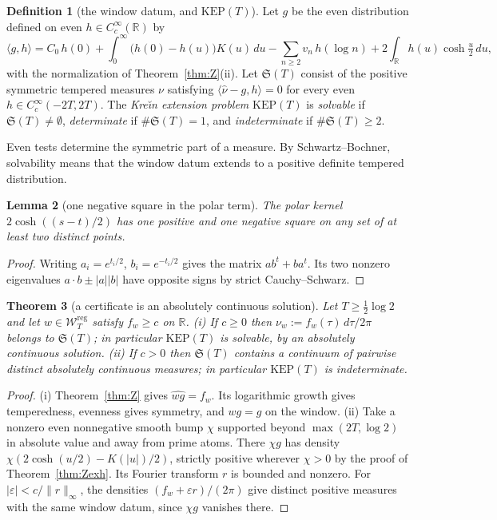 \documentclass[10pt]{amsart}
\newtheorem{theorem}{Theorem}[section]
\newtheorem{lemma}[theorem]{Lemma}
\theoremstyle{definition}
\newtheorem{definition}[theorem]{Definition}
\theoremstyle{remark}
\newcommand{\R}{\mathbb R}
\newcommand{\nuh}{\widehat\nu}
\newcommand{\Wcl}{\mathcal W_T}
\begin{document}
\begin{definition}[the window datum, and $\mathrm{KEP}(T)$]\label{def:KEP}
Let $g$ be the even distribution defined on even $h\in C_c^\infty(\R)$ by
\begin{equation}\label{eq:gdatum}
\langle g,h\rangle=C_0\,h(0)+\int_0^\infty\big(h(0)-h(u)\big)K(u)\,du-\sum_{n\ge2}v_n\,h(\log n)
+2\int_\R h(u)\cosh\tfrac u2\,du,
\end{equation}
with the normalization of Theorem~\ref{thm:Z}(ii). Let $\mathfrak S(T)$ consist of the positive
symmetric tempered measures $\nu$ satisfying $\langle\nuh-g,h\rangle=0$
for every even $h\in C_c^\infty(-2T,2T)$.
The \emph{Kre\u{\i}n extension problem} $\mathrm{KEP}(T)$ is \emph{solvable} if
$\mathfrak S(T)\ne\emptyset$, \emph{determinate} if $\#\mathfrak S(T)=1$, and \emph{indeterminate}
if $\#\mathfrak S(T)\ge2$.
\end{definition}
Even tests determine the symmetric part of a measure. By Schwartz--Bochner,
solvability means that the window datum extends to a positive definite tempered distribution.

\begin{lemma}[one negative square in the polar term]\label{lem:polar}
The polar kernel $2\cosh((s-t)/2)$ has one positive and one negative
square on any set of at least two distinct points.
\end{lemma}
\begin{proof}
Writing $a_i=e^{t_i/2}$, $b_i=e^{-t_i/2}$ gives the matrix $ab^t+ba^t$.
Its two nonzero eigenvalues $a\cdot b\pm|a||b|$ have opposite signs
by strict Cauchy--Schwarz.
\end{proof}

\begin{theorem}[a certificate is an absolutely continuous solution]\label{thm:KEP1}
Let $T\ge\frac12\log2$ and let $w\in\Wcl^{\mathrm{reg}}$ satisfy $f_w\ge c$ on $\R$.
\emph{(i)} If $c\ge0$ then $\nu_w:=f_w(\tau)\,d\tau/2\pi$ belongs to $\mathfrak S(T)$; in particular
$\mathrm{KEP}(T)$ is solvable, by an absolutely continuous solution.
\emph{(ii)} If $c>0$ then $\mathfrak S(T)$ contains a continuum of pairwise distinct absolutely
continuous measures; in particular $\mathrm{KEP}(T)$ is indeterminate.
\end{theorem}
\begin{proof}
(i) Theorem~\ref{thm:Z} gives $\widehat{wg}=f_w$. Its logarithmic growth
gives temperedness, evenness gives symmetry, and $wg=g$ on the window.
(ii) Take a nonzero even nonnegative smooth bump $\chi$ supported beyond
$\max(2T,\log2)$ in absolute value and away from prime atoms.
There $\chi g$ has density $\chi(2\cosh(u/2)-K(|u|)/2)$, strictly
positive wherever $\chi>0$ by the proof of Theorem~\ref{thm:Zexh}.
Its Fourier transform $r$ is bounded and nonzero. For
$|\varepsilon|<c/\|r\|_\infty$, the densities
$(f_w+\varepsilon r)/(2\pi)$ give distinct positive measures with
the same window datum, since $\chi g$ vanishes there.
\end{proof}
\end{document}
